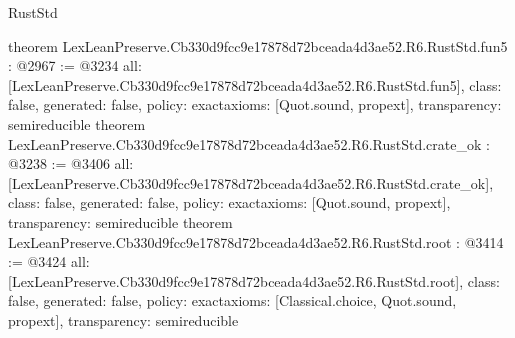 \begin{lexlean}{RustStd}
\begin{coremodule}
{}
theorem LexLeanPreserve.Cb330d9fcc9e17878d72bceada4d3ae52.R6.RustStd.fun5 : @2967 := @3234 {
  all: [LexLeanPreserve.Cb330d9fcc9e17878d72bceada4d3ae52.R6.RustStd.fun5],
  class: false,
  generated: false,
  policy: exact{axioms: [Quot.sound, propext]},
  transparency: semireducible
}
theorem LexLeanPreserve.Cb330d9fcc9e17878d72bceada4d3ae52.R6.RustStd.crate_ok : @3238 := @3406 {
  all: [LexLeanPreserve.Cb330d9fcc9e17878d72bceada4d3ae52.R6.RustStd.crate_ok],
  class: false,
  generated: false,
  policy: exact{axioms: [Quot.sound, propext]},
  transparency: semireducible
}
theorem LexLeanPreserve.Cb330d9fcc9e17878d72bceada4d3ae52.R6.RustStd.root : @3414 := @3424 {
  all: [LexLeanPreserve.Cb330d9fcc9e17878d72bceada4d3ae52.R6.RustStd.root],
  class: false,
  generated: false,
  policy: exact{axioms: [Classical.choice, Quot.sound, propext]},
  transparency: semireducible
}


\end{coremodule}
\end{lexlean}
